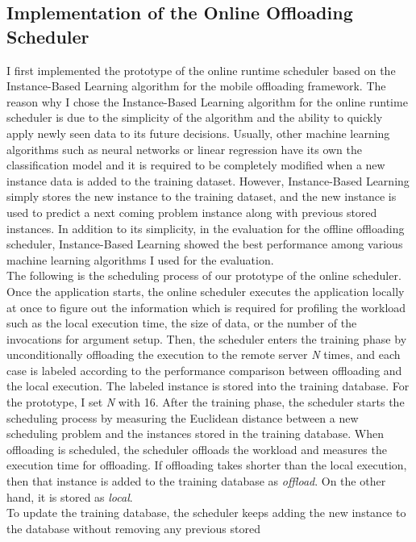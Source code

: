 \subsection{Implementation of the Online Offloading Scheduler}
\label{scheduler:online_impl}
%
I first implemented the prototype of the online runtime scheduler
based on the Instance-Based Learning algorithm for the mobile offloading
framework.
%
The reason why I chose the Instance-Based Learning algorithm for the
online runtime scheduler is due to the simplicity of the algorithm and
the ability to quickly apply newly seen data to its future decisions.
%
Usually, other machine learning algorithms such as neural networks or
linear regression have its own the classification model and it is
required to be completely modified when a new instance data is added to
the training dataset.
%
However, Instance-Based Learning simply stores the new instance to the
training dataset, and the new instance is used to predict a next coming
problem instance along with previous stored instances.
%
In addition to its simplicity, in the evaluation for the offline offloading scheduler,
Instance-Based Learning showed the best performance among various
machine learning algorithms I used for the evaluation.\\
%
The following is the scheduling process of our prototype of the online
scheduler.
%
Once the application starts, the online scheduler executes the
application locally at once to figure out the information which is
required for profiling the workload such as the local execution time, the
size of data, or the number of the invocations for argument setup.
%
Then, the scheduler enters the training phase by unconditionally
offloading the execution to the remote server {\it N} times, and
each case is labeled according to the performance comparison between
offloading and the local execution.
%
The labeled instance is stored into the training database.
%
For the prototype, I set {\it N} with 16.
%
After the training phase, the scheduler starts the scheduling process by
measuring the Euclidean distance between a new scheduling problem and
the instances stored in the training database.
%
When offloading is scheduled, the scheduler offloads the workload and 
measures the execution time for offloading.
%
If offloading takes shorter than the local execution, then that instance
is added to the training database as {\it offload}.
%
On the other hand, it is stored as {\it local}.\\
%
To update the training database, the scheduler keeps adding the
new instance to the database without removing any previous stored
